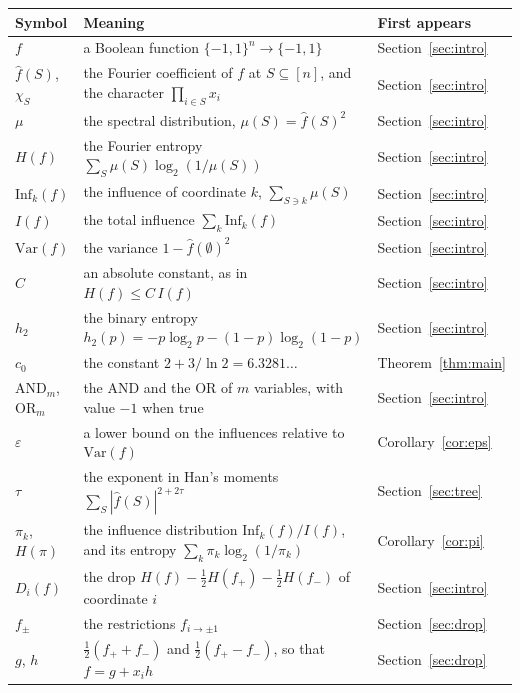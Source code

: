 \documentclass[11pt]{amsart}
\theoremstyle{remark}
\newcommand{\Inf}{\mathrm{Inf}}
\newcommand{\Var}{\mathrm{Var}}
\begin{document}
\begin{longtable}{@{}>{\raggedright\arraybackslash}p{}>{\raggedright\arraybackslash}p{}>{\raggedright\arraybackslash}p{}@{}}
\toprule
Symbol & Meaning & First appears \\
\midrule
\endhead
$f$ & a Boolean function $\{-1,1\}^n\to\{-1,1\}$ & Section~\ref{sec:intro} \\
$\hat f(S)$, $\chi_S$ & the Fourier coefficient of $f$ at $S\subseteq[n]$, and the character $\prod_{i\in S}x_i$ & Section~\ref{sec:intro} \\
$\mu$ & the spectral distribution, $\mu(S)=\hat f(S)^2$ & Section~\ref{sec:intro} \\
$H(f)$ & the Fourier entropy $\sum_S\mu(S)\log_2(1/\mu(S))$ & Section~\ref{sec:intro} \\
$\Inf_k(f)$ & the influence of coordinate $k$, $\sum_{S\ni k}\mu(S)$ & Section~\ref{sec:intro} \\
$I(f)$ & the total influence $\sum_k\Inf_k(f)$ & Section~\ref{sec:intro} \\
$\Var(f)$ & the variance $1-\hat f(\emptyset)^2$ & Section~\ref{sec:intro} \\
$C$ & an absolute constant, as in $H(f)\le C\,I(f)$ & Section~\ref{sec:intro} \\
$h_2$ & the binary entropy $h_2(p)=-p\log_2p-(1-p)\log_2(1-p)$ & Section~\ref{sec:intro} \\
$c_0$ & the constant $2+3/\ln2=6.3281\dots$ & Theorem~\ref{thm:main} \\
$\mathrm{AND}_m$, $\mathrm{OR}_m$ & the AND and the OR of $m$ variables, with value $-1$ when true & Section~\ref{sec:intro} \\
$\varepsilon$ & a lower bound on the influences relative to $\Var(f)$ & Corollary~\ref{cor:eps} \\
$\tau$ & the exponent in Han's moments $\sum_S|\hat f(S)|^{2+2\tau}$ & Section~\ref{sec:tree} \\
$\pi_k$, $H(\pi)$ & the influence distribution $\Inf_k(f)/I(f)$, and its entropy $\sum_k\pi_k\log_2(1/\pi_k)$ & Corollary~\ref{cor:pi} \\
$D_i(f)$ & the drop $H(f)-\tfrac12H(f_+)-\tfrac12H(f_-)$ of coordinate $i$ & Section~\ref{sec:intro} \\
$f_\pm$ & the restrictions $f_{i\to\pm1}$ & Section~\ref{sec:drop} \\
$g$, $h$ & $\tfrac12(f_++f_-)$ and $\tfrac12(f_+-f_-)$, so that $f=g+x_ih$ & Section~\ref{sec:drop} \\

\end{longtable}
\end{document}
